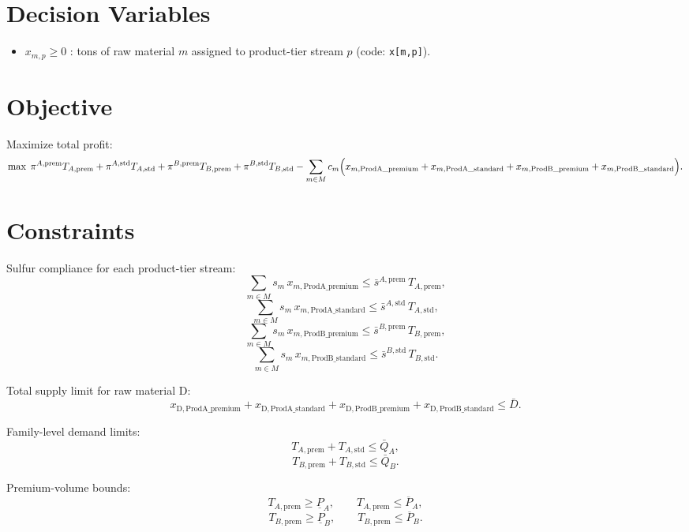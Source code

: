 \section*{Decision Variables}

\begin{itemize}
    \item $x_{m,p} \ge 0$ : tons of raw material $m$ assigned to product-tier stream $p$ (code: \texttt{x[m,p]}).
\end{itemize}

\section*{Objective}

Maximize total profit:
\[
\max \;
\pi^{A,\mathrm{prem}} T_{A,\mathrm{prem}}
+\pi^{A,\mathrm{std}} T_{A,\mathrm{std}}
+\pi^{B,\mathrm{prem}} T_{B,\mathrm{prem}}
+\pi^{B,\mathrm{std}} T_{B,\mathrm{std}}
-\sum_{m\in M} c_m \Bigl(
x_{m,\mathrm{ProdA\_premium}}
+x_{m,\mathrm{ProdA\_standard}}
+x_{m,\mathrm{ProdB\_premium}}
+x_{m,\mathrm{ProdB\_standard}}
\Bigr).
\]

\section*{Constraints}

Sulfur compliance for each product-tier stream:
\[
\sum_{m\in M} s_m\, x_{m,\mathrm{ProdA\_premium}}
\le
\bar{s}^{A,\mathrm{prem}} \, T_{A,\mathrm{prem}},
\]
\[
\sum_{m\in M} s_m\, x_{m,\mathrm{ProdA\_standard}}
\le
\bar{s}^{A,\mathrm{std}} \, T_{A,\mathrm{std}},
\]
\[
\sum_{m\in M} s_m\, x_{m,\mathrm{ProdB\_premium}}
\le
\bar{s}^{B,\mathrm{prem}} \, T_{B,\mathrm{prem}},
\]
\[
\sum_{m\in M} s_m\, x_{m,\mathrm{ProdB\_standard}}
\le
\bar{s}^{B,\mathrm{std}} \, T_{B,\mathrm{std}}.
\]

Total supply limit for raw material D:
\[
x_{\mathrm{D},\mathrm{ProdA\_premium}}
+x_{\mathrm{D},\mathrm{ProdA\_standard}}
+x_{\mathrm{D},\mathrm{ProdB\_premium}}
+x_{\mathrm{D},\mathrm{ProdB\_standard}}
\le \bar{D}.
\]

Family-level demand limits:
\[
T_{A,\mathrm{prem}} + T_{A,\mathrm{std}} \le \bar{Q}_A,
\]
\[
T_{B,\mathrm{prem}} + T_{B,\mathrm{std}} \le \bar{Q}_B.
\]

Premium-volume bounds:
\[
T_{A,\mathrm{prem}} \ge \underline{P}_A,
\qquad
T_{A,\mathrm{prem}} \le \overline{P}_A,
\]
\[
T_{B,\mathrm{prem}} \ge \underline{P}_B,
\qquad
T_{B,\mathrm{prem}} \le \overline{P}_B.
\]

